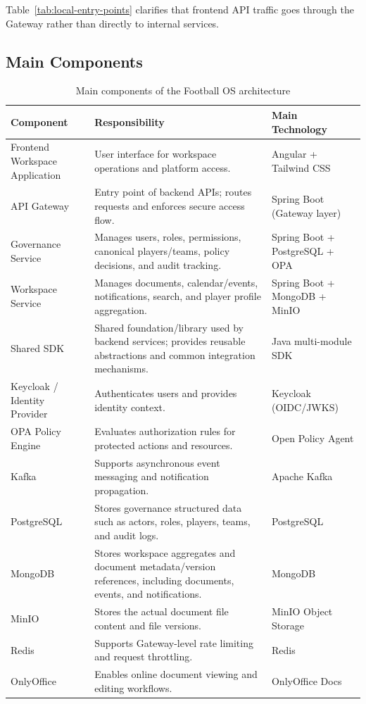 Table~\ref{tab:local-entry-points} clarifies that frontend API traffic goes
through the Gateway rather than directly to internal services.

\subsection{Main Components}

\begin{table}[ht]
\centering
\caption{Main components of the Football OS architecture}
\label{tab:main-components}
\small
\setlength{\tabcolsep}{4pt}
\renewcommand{\arraystretch}{1.10}
\begin{tabularx}{\textwidth}{|L{3.7cm}|Y|L{3.3cm}|}
\hline
\textbf{Component} & \textbf{Responsibility} & \textbf{Main Technology} \\
\hline
Frontend Workspace Application & User interface for workspace operations and platform access. & Angular + Tailwind CSS \\
\hline
API Gateway & Entry point of backend APIs; routes requests and enforces secure access flow. & Spring Boot (Gateway layer) \\
\hline
Governance Service & Manages users, roles, permissions, canonical players/teams, policy decisions, and audit tracking. & Spring Boot + PostgreSQL + OPA \\
\hline
Workspace Service & Manages documents, calendar/events, notifications, search, and player profile aggregation. & Spring Boot + MongoDB + MinIO \\
\hline
Shared SDK & Shared foundation/library used by backend services; provides reusable abstractions and common integration mechanisms. & Java multi-module SDK \\
\hline
Keycloak / Identity Provider & Authenticates users and provides identity context. & Keycloak (OIDC/JWKS) \\
\hline
OPA Policy Engine & Evaluates authorization rules for protected actions and resources. & Open Policy Agent \\
\hline
Kafka & Supports asynchronous event messaging and notification propagation. & Apache Kafka \\
\hline
PostgreSQL & Stores governance structured data such as actors, roles, players, teams, and audit logs. & PostgreSQL \\
\hline
MongoDB & Stores workspace aggregates and document metadata/version references, including documents, events, and notifications. & MongoDB \\
\hline
MinIO & Stores the actual document file content and file versions. & MinIO Object Storage \\
\hline
Redis & Supports Gateway-level rate limiting and request throttling. & Redis \\
\hline
OnlyOffice & Enables online document viewing and editing workflows. & OnlyOffice Docs \\
\hline
\end{tabularx}
\normalsize
\end{table}

